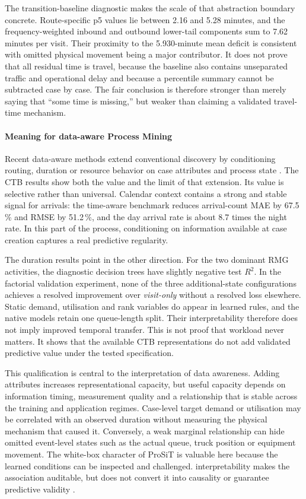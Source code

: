 The transition-baseline diagnostic makes the scale of that abstraction
boundary concrete. Route-specific p5 values lie between 2.16 and 5.28 minutes,
and the frequency-weighted inbound and outbound lower-tail components sum to
7.62 minutes per visit. Their proximity to the 5.930-minute mean deficit is
consistent with omitted physical movement being a major contributor. It does
not prove that all residual time is travel, because the baseline also contains
unseparated traffic and operational delay and because a percentile summary
cannot be subtracted case by case. The fair conclusion is therefore stronger
than merely saying that ``some time is missing,'' but weaker than claiming a
validated travel-time mechanism.

\paragraph{Meaning for data-aware Process Mining}
Recent data-aware methods extend conventional discovery by conditioning
routing, duration or resource behavior on case attributes and process state
\cite{mannhardt2023stochasticProcessesModelling,Vinci2023Inf.Activ.Prob,Vinci2026prosit}.
The CTB results show both the value and the limit of that extension. Its value
is selective rather than universal. Calendar context contains a strong and
stable signal for arrivals: the time-aware benchmark reduces arrival-count
MAE by 67.5\,\% and RMSE by 51.2\,\%, and the day arrival rate is about 8.7
times the night rate. In this part of the process, conditioning on information
available at case creation captures a real predictive regularity.

The duration results point in the other direction. For the two dominant RMG
activities, the diagnostic decision trees have slightly negative test
$R^2$. In the factorial validation experiment, none of the three
additional-state configurations achieves a resolved improvement over
\textit{visit-only} without a resolved loss elsewhere. Static demand,
utilisation and rank variables do appear in learned rules, and the native
models retain one queue-length split. Their interpretability therefore does
not imply improved temporal transfer. This is not proof that workload never
matters. It shows that the available CTB representations do not add validated
predictive value under the tested specification.

This qualification is central to the interpretation of data awareness.
Adding attributes increases representational capacity, but useful capacity
depends on information timing, measurement quality and a relationship that is
stable across the training and application regimes. Case-level target demand
or utilisation may be correlated with an observed duration without measuring
the physical mechanism that caused it. Conversely, a weak marginal
relationship can hide omitted event-level states such as the actual queue,
truck position or equipment movement. The white-box character of ProSiT is
valuable here because the learned conditions can be inspected and challenged.
interpretability makes the association auditable, but does not convert it into
causality or guarantee predictive validity
\cite{Vinci2026prosit,Sargent2013Validation}.

